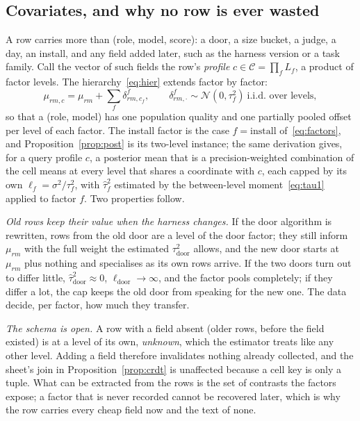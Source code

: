 \documentclass[10pt,a4paper]{article}
\theoremstyle{definition}
\theoremstyle{remark}
\begin{document}
\subsection{Covariates, and why no row is ever wasted}
\label{sec:covariates}

A row carries more than (role, model, score): a door, a size bucket, a judge, a day, an install, and any field added later, such as the harness version or a task family. Call the vector of such fields the row's \emph{profile} $c\in\mathcal C=\prod_f L_f$, a product of factor levels. The hierarchy~\eqref{eq:hier} extends factor by factor:
\begin{equation}
\mu_{rm,c}=\mu_{rm}+\sum_{f}\delta^{f}_{rm,c_f},\qquad \delta^{f}_{rm,\cdot}\sim\mathcal N(0,\tau_f^2)\ \text{i.i.d.\ over levels},
\label{eq:factors}
\end{equation}
so that a (role, model) has one population quality and one partially pooled offset per level of each factor. The install factor is the case $f=\text{install}$ of~\eqref{eq:factors}, and Proposition~\ref{prop:post} is its two-level instance; the same derivation gives, for a query profile $c$, a posterior mean that is a precision-weighted combination of the cell means at every level that shares a coordinate with $c$, each capped by its own $\ell_f=\sigma^2/\tau_f^2$, with $\hat\tau_f^2$ estimated by the between-level moment~\eqref{eq:tau1} applied to factor $f$. Two properties follow.

\emph{Old rows keep their value when the harness changes.} If the door algorithm is rewritten, rows from the old door are a level of the door factor; they still inform $\mu_{rm}$ with the full weight the estimated $\tau_{\text{door}}^2$ allows, and the new door starts at $\mu_{rm}$ plus nothing and specialises as its own rows arrive. If the two doors turn out to differ little, $\hat\tau_{\text{door}}^2\approx 0$, $\ell_{\text{door}}\to\infty$, and the factor pools completely; if they differ a lot, the cap keeps the old door from speaking for the new one. The data decide, per factor, how much they transfer.

\emph{The schema is open.} A row with a field absent (older rows, before the field existed) is at a level of its own, \emph{unknown}, which the estimator treats like any other level. Adding a field therefore invalidates nothing already collected, and the sheet's join in Proposition~\ref{prop:crdt} is unaffected because a cell key is only a tuple. What can be extracted from the rows is the set of contrasts the factors expose; a factor that is never recorded cannot be recovered later, which is why the row carries every cheap field now and the text of none.
\end{document}
